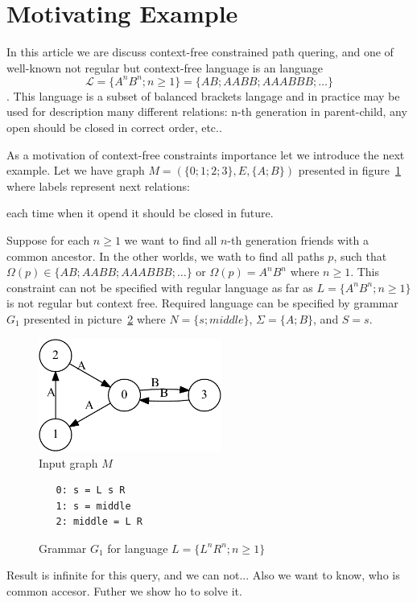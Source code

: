 \section{Motivating Example}

In this article we are discuss context-free constrained path quering, and one of well-known not regular but context-free language is an 
language $$\mathcal{L} = \{A^n B^n; n \geq 1\} = \{AB; AABB; AAABBB; \dots\}$$.
This language is a subset of balanced brackets langage and in practice may be used for description many different relations: n-th generation in parent-child, any open should be closed in correct order, etc.. 

As a motivation of context-free constraints importance let we introduce the next example.
Let we have graph $M=(\{0;1;2;3\},E,\{A;B\})$ presented in figure~\ref{input} where labels represent next relations:

each time when it opend it should be closed in future.

Suppose for each $n \geq 1$ we want to find all $n$-th generation friends with a common ancestor.
In the other worlds, we wath to find all paths $p$, such that $\Omega(p) \in \{AB; AABB; AAABBB; \dots\}$ or $\Omega(p) = A^n B^n$ where $n \geq 1$.
This constraint can not be specified with regular language as far as $L=\{A^n B^n; n \geq 1\}$ is not regular but context free.
Required language can be specified by grammar $G_1$ presented in picture~\ref{grammarG} where $N = \{s; middle\}$, $\Sigma = \{A; B\}$, and $S = s$.

\begin{figure}[h]
    \begin{center}
        \includegraphics[width=6cm]{dot/input.pdf}
        \caption{Input graph $M$}
        \label{input}        
    \end{center}
\end{figure}

\begin{figure}[h]
   \begin{center}
\begin{verbatim}
   0: s = L s R 
   1: s = middle
   2: middle = L R
\end{verbatim}
   \caption{Grammar $G_1$ for language $L=\{L^n R^n; n \geq 1\}$}
   \label{grammarG}        
   \end{center}
\end{figure}


Result is infinite for this query, and we can not... 
Also we want to know, who is common accesor.
Futher we show ho to solve it.
